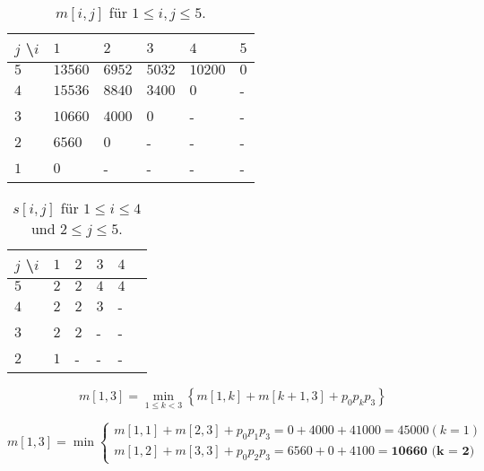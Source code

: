 \documentclass{article}
\begin{document}
\begin{minipage}{.45\textwidth}
\begin{table}[H]
  \centering
  \begin{tabular}{|l|l|l|l|l|l|}
  \hline
  $j$ \textbackslash $i$  & $1$     & $2$     & $3$     & $4$     & $5$ \tabularnewline
  \hline\hline
  $5$                     & $13560$ & $6952$  & $5032$  & $10200$ & $0$ \tabularnewline
  \hline
  $4$                     & $15536$ & $8840$  & $3400$  & $0$     & -   \tabularnewline
  \hline
  $3$                     & $10660$ & $4000$  & $0$     & -       & -   \tabularnewline
  \hline
  $2$                     & $6560$  & $0$     & -       & -       & -   \tabularnewline
  \hline
  $1$                     & $0$     & -       & -       & -       & -   \tabularnewline
  \hline\hline
  \end{tabular}
  \caption{$m[i, j]$ f{\"u}r $1 \leq i, j \leq 5$.}
  \label{tbl:m}
\end{table}
\end{minipage}
\begin{minipage}{.45\textwidth}
\begin{table}[H]
  \centering
  \begin{tabular}{|l|l|l|l|l|l|}
  \hline
  $j$ \textbackslash $i$  & $1$ & $2$  & $3$  & $4$ \tabularnewline
  \hline\hline
  $5$                     & $2$ & $2$  & $4$  & $4$ \tabularnewline
  \hline
  $4$                     & $2$ & $2$  & $3$  & -   \tabularnewline
  \hline
  $3$                     & $2$ & $2$  & -    & -   \tabularnewline
  \hline
  $2$                     & $1$ & -    & -    & -   \tabularnewline
  \hline\hline
  \end{tabular}
  \caption{$s[i, j]$ f{\"u}r $1 \leq i \leq 4$ und $2 \leq j \leq 5$.}
  \label{tbl:s}
\end{table}
\end{minipage}

\clearpage

\begin{equation}
m[1, 3] = \min\limits_{1 \leq k < 3} \left\{ m[1, k] + m[k + 1, 3] + p_0p_kp_3 \right\}
\end{equation}

\begin{equation}
m[1, 3] = \min\begin{cases}
  m[1, 1] + m[2, 3] + p_0p_1p_3 = 0 + 4000 + 41000 = 45000 (k = 1)\\
  m[1, 2] + m[3, 3] + p_0p_2p_3 = 6560 + 0 + 4100 = \textbf{10660 (k = 2)}
\end{cases}
\end{equation}
\end{document}
